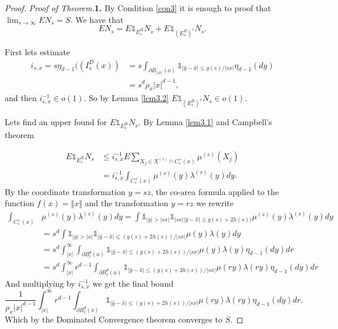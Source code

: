 \begin{proof}
\textit{Proof of Theorem.}\textbf{1.} By Condition \ref{con3} it is enough to proof that $\lim_{s\rightarrow\infty}EN_s=S$. We have that
 $$EN_s=E\mathds{1}_{E^{R}_s}N_s+E\mathds{1}_{(E^{R}_s)^c}N_s .$$

First lets estimate  
\begin{align}
i_{s, x}=s\eta_{d-1}((I^D_s(x))&=s\int_{\partial B_{\vert sx\vert}(o)}\mathds{1}_{\vert\hat{y}-\hat{x}\vert\leq g(s)/\vert sx\vert}\eta_{d-1}(dy)\nonumber\\
&=s^d\rho_x\vert x\vert^{d-1},\nonumber
\end{align} 
and then $i_{s, x}^{-1}\in o(1) $. So by Lemma \ref{lem3.2} $E\mathds{1}_{(E^{R}_s)^c}N_s\in o(1)$.

Lets find an upper found for $E\mathds{1}_{E^{R}_s}N_s$. By Lemma \ref{lem3.1} and Campbell's theorem 

 \begin{align}
 E\mathds{1}_{E^{R}_s}N_s&\leq i_{s, x}^{-1}E\sum_{X_j\in X^{(s)}\cap C^+_s(x)}\mu^{(s)}(X_j)\nonumber\\
 &=i_{s, x}^{-1}\int_{C^+_s(x)}\mu^{(s)}(y)\lambda^{(s)}(y)dy\nonumber.
 \end{align}
By the coordinate transformation $y=sz$, the co-area formula applied to the function $f(x)=\Vert x\Vert$ and the transformation $y=rz$ we rewrite
\begin{align}
\int_{C^+_s(x)}&\mu^{(s)}(y)\lambda^{(s)}(y)dy=\int \mathds{1}_{\vert y\vert >\vert sx\vert}\mathds{1}_{\vert sx \vert\vert \hat{y}-\hat{x}\vert \leq g(s)+2h(s))}\mu^{(s)}(y)\lambda^{(s)}(y)dy\nonumber\\
&=s^d\int \mathds{1}_{\vert y\vert >\vert x\vert}\mathds{1}_{\vert \hat{y}-\hat{x}\vert \leq (g(s)+2h(s))/\vert sx\vert}\mu(y)\lambda(y)dy\nonumber\\
&=s^d\int_{\vert x\vert}^{\infty}\int_{\partial B^d_r(o)} \mathds{1}_{\vert \hat{y}-\hat{x}\vert \leq (g(s)+2h(s))/\vert sx\vert}\mu(y)\lambda(y)\eta_{d-1}(dy)dr\nonumber\\
&=s^d\int_{\vert x\vert}^{\infty} r^{d-1}\int_{\partial B^d_1(o)}\mathds{1}_{\vert \hat{y}-\hat{x}\vert \leq (g(s)+2h(s))/\vert sx\vert}\mu(ry)\lambda(ry)\eta_{d-1}(dy)dr\nonumber
\end{align}
And multiplying by $i_{s, x}^{-1}$ we get the final bound
$$\frac{1}{\rho_x\vert x\vert^{d-1}}\int_{\vert x\vert}^{\infty} r^{d-1}\int_{\partial B^d_1(o)} \mathds{1}_{\vert \hat{y}-\hat{x}\vert \leq (g(s)+2h(s))/\vert sx\vert}\mu(ry)\lambda(ry)\eta_{d-1}(dy) dr.$$ 
Which by the Dominated Convergence theorem converges to $S$.



\end{proof}
